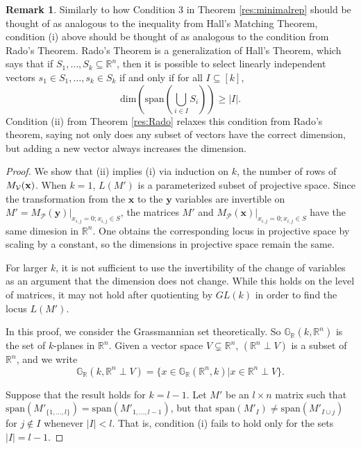 \documentclass[11pt]{article}
\newcommand{\sanote}{\todo[color=violet!30]}
\newcommand{\R}{\mathbb{R}}
\newcommand{\Grall}{\mathbb{G}_{\R}}
\newcommand{\cP}{\mathcal{P}}
\newcommand{\cV}{\mathcal{V}}
\theoremstyle{remark}
\theoremstyle{definition}
\newtheorem{rmk}[thm]{Remark}
\begin{document}
\begin{appendices}
\begin{rmk}
Similarly to how Condition 3 in Theorem \ref{res:minimalrep} should be thought of as analogous to the inequality from Hall's Matching Theorem, condition (i) above should be thought of as analogous to the condition from Rado's Theorem. Rado's Theorem is a generalization of Hall's Theorem, which says that if $S_1, \dots, S_k \subseteq \mathbb{R}^{n}$, then it is possible to select linearly independent vectors $s_1 \in S_1, \dots, s_k \in S_k$ if and only if for all $I \subseteq [k]$,
%
\begin{displaymath}
\mathrm{dim}\left(\mathrm{span}\left( \bigcup_{i \in I} S_i \right) \right) \geq |I|.
\end{displaymath}
%
\noindent
Condition (ii) from Theorem \ref{res:Rado} relaxes this condition from Rado's theorem, saying not only does any subset of vectors have the correct dimension, but adding a new vector always increases the dimension.
\end{rmk}

\begin{proof}
We show that (ii) implies (i) via induction on $k$, the number of rows of $M_\cV(\bf{x})$. When $k = 1$, $L(M')$ is a parameterized subset of projective space. Since the transformation from the $\mathbf{x}$ to the $\mathbf{y}$ variables are invertible on $M' = M_{\cP}(\mathbf{y})|_{x_{i,j} = 0; x_{i,j} \in S}$, the matrices $M'$ and $M_{\cP}(\mathbf{x})|_{x_{i,j} = 0; x_{i,j} \in S}$ have the same dimesion in $\R^n$. One obtains the corresponding locus in projective space by scaling by a constant, so the dimensions in projective space remain the same. 

For larger $k$, it is not sufficient to use the invertibility of the change of variables as an argument that the dimension does not change. While this holds on the level of matrices, it may not hold after quotienting by $GL(k)$ in order to find the locus $L(M')$.

In this proof, we consider the Grassmannian set theoretically. So $\Grall(k, \mathbb{R}^n)$ is the set of $k$-planes in $\mathbb{R}^n$. Given a vector space $V \subsetneq \R^n$,  $(\mathbb{R}^n \perp V)$ is a subset of $\mathbb{R}^n$, and we write 
\begin{displaymath}
\Grall(k, \mathbb{R}^n \perp V) = \{x \in  \Grall(\mathbb{R}^n,k)| x \in \R^n \perp V\}.
\end{displaymath}
\noindent

Suppose that the result holds for $k = l-1$. Let $M'$ be an $l \times n$ matrix such that $\mathrm{span}(M'_{\{1,\dots,l\}}) = \mathrm{span}(M'_{1,\dots,l-1})$, but that $\mathrm{span}(M'_I) \neq \mathrm{span}(M'_{I \cup j})$ for $j \notin I$ whenever $|I| < l$. That is, condition (i) fails to hold only for the sets $|I| = l-1$. %


\end{proof}
\end{appendices}
\end{document}
